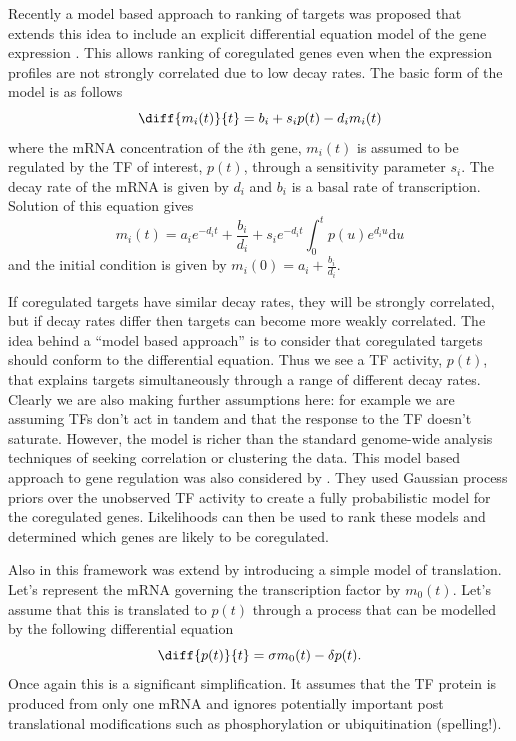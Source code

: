 \documentclass{article}
\begin{document}
Recently a  model based  approach to ranking  of targets  was proposed
that extends  this idea to  include an explicit  differential equation
model of  the gene expression \cite{Barenco:ranked06}. This  allows ranking of
coregulated genes  even when the expression profiles  are not strongly
correlated due to  low decay rates. The basic form of  the model is as
follows
\begin{equation}
  \diff{m_i(t)}{t} = b_i + s_i p(t) - d_i m_i(t)
\end{equation}
where the mRNA concentration of the $i$th gene, $m_i(t)$ is assumed to
be  regulated by  the TF  of interest,  $p(t)$, through  a sensitivity
parameter $s_i$.  The decay  rate of  the mRNA is  given by  $d_i$ and
$b_i$  is a  basal rate  of transcription.  Solution of  this equation
gives
\begin{equation}
  m_i(t) = a_i e^{-d_it} + \frac{b_i}{d_i} + s_i
  e^{-d_it}\int_0^tp(u)e^{d_i u}\mathrm{d} u \label{eq:linearOperator}
\end{equation}
and the initial condition is given by $m_i(0)=a_i + \frac{b_i}{d_i}$. 

If coregulated targets have similar decay rates, they will be strongly
correlated, but  if decay  rates differ then  targets can  become more
weakly correlated.  The  idea behind a ``model based  approach'' is to
consider that  coregulated targets should conform  to the differential
equation. Thus  we see  a TF activity,  $p(t)$, that  explains targets
simultaneously through  a range of different decay  rates.  Clearly we
are also making further assumptions  here: for example we are assuming
TFs  don't act  in tandem  and  that the  response to  the TF  doesn't
saturate. However,  the model is  richer than the  standard genome-wide
analysis   techniques  of  seeking   correlation  or   clustering  the
data. This model based approach to gene regulation was also considered
by  \cite{Gao:latent08}. They  used Gaussian  process priors  over the
unobserved TF activity  to create a fully probabilistic  model for the
coregulated genes.  Likelihoods can then  be used to rank these models
and determined which genes are likely to be coregulated.

Also in \cite{Gao:latent08} this framework was extend by introducing a
simple model  of translation.  Let's represent the  mRNA governing the
transcription factor by $m_0(t)$. Let's assume that this is translated
to  $p(t)$ through a  process that  can be  modelled by  the following
differential equation
\begin{equation}
  \diff{p(t)}{t} = \sigma m_0(t) - \delta p(t).
\end{equation}
Once again this  is a significant simplification. It  assumes that the
TF  protein is  produced from  only one  mRNA and  ignores potentially
important post translational  modifications such as phosphorylation or
ubiquitination (spelling!).
\end{document}
